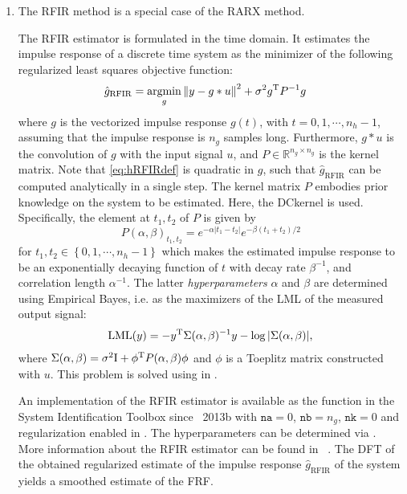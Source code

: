 \begin{enumerate}
\item \emph{}

The \gls{RFIR} method is a special case of the \gls{RARX} method. 

The \gls{RFIR} estimator is formulated in the time domain. 
It estimates the impulse response of a discrete time system as the minimizer of the following regularized least squares objective function:
\begin{align}\label{eq:hRFIRdef}
\hat g_{\mathrm{RFIR}} &= \operatorname*{argmin}_{g} \left\| y - g \ast u  \right\|_{}^2 + \sigma^2 g^{\mathrm{T}}P^{-1}g
\end{align}
where $g$ is the vectorized impulse response $g(t)$, with $t = 0,1,\cdots,n_h - 1$, assuming that the impulse response is $n_g$ samples long. 
Furthermore, $g\ast u$ is the convolution of $g$ with the input signal $u$, and $P\in \mathbb{R}^{n_g\times n_g}$ is the kernel matrix. 
Note that \eqref{eq:hRFIRdef} is quadratic in $g$, such that $\hat g_{\mathrm{RFIR}}$ can be computed analytically in a single step.
The kernel matrix $P$ embodies prior knowledge on the system to be estimated. 
Here, the \gls{DCkernel} is used. 
Specifically, the element at $t_1,t_2$ of $P$ is given by
\begin{equation}
P(\alpha,\beta)_{t_1,t_2} = e^{-\alpha|t_1 - t_2|}e^{-\beta(t_1 + t_2)/2}
\end{equation}
 for $t_1,t_2 \in \left\{0,1,\cdots,n_h - 1\right\}$ which makes the estimated impulse response to be an exponentially decaying function of $t$ with decay rate $\beta^{-1}$, and correlation length $\alpha^{-1}$. 
 The latter \emph{hyperparameters} $\alpha$ and $\beta$ are determined using Empirical Bayes, i.e. as the maximizers of the \gls{LML} of the measured output signal:
\begin{align}
\mathrm{LML}(y) = -y^{\mathrm{T}}\Sigma(\alpha,\beta)^{-1}y - \log |\Sigma(\alpha,\beta)| \text{,}
\end{align}
where $\Sigma(\alpha,\beta) = \sigma^2 \mathrm{I} + \phi^{\mathrm{T}}P(\alpha,\beta)\phi$ and $\phi$ is a Toeplitz matrix constructed with $u$. 
This problem is solved using  in \MATLAB.

An implementation of the \gls{RFIR} estimator is available as the  function in the System Identification Toolbox since \MATLAB~2013b with $\mathtt{na} = 0$, $\mathtt{nb} = n_g$, $\mathtt{nk}=0$ and regularization enabled in . 
The hyperparameters can be determined via .
More information about the \gls{RFIR} estimator can be found in
~\citep{Pillonetto2010,Chen2012}. 
The \gls{DFT} of the obtained regularized estimate of the impulse response $\hat g_{\mathrm{RFIR}}$ of the system yields a smoothed estimate of the FRF.
\end{enumerate}

